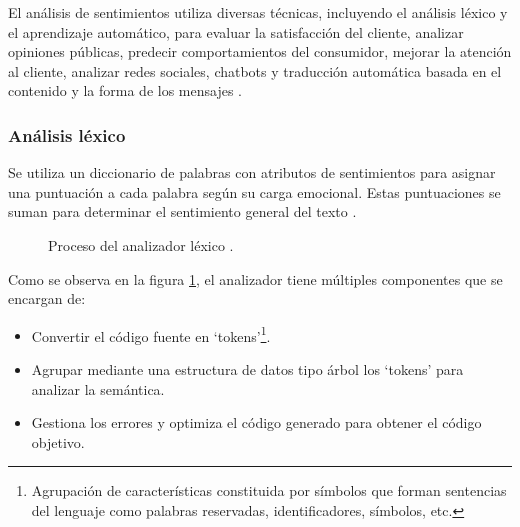 \documentclass[12pt,twoside]{article}
\begin{document}
	El análisis de sentimientos utiliza diversas técnicas, incluyendo el análisis léxico y el aprendizaje automático, para evaluar la satisfacción del cliente, analizar opiniones públicas, predecir comportamientos del consumidor, mejorar la atención al cliente, analizar redes sociales, chatbots y traducción automática basada en el contenido y la forma de los mensajes \cite{info: pln3}.
	
	\subsubsection{Análisis léxico}
	
	Se utiliza un diccionario de palabras con atributos de sentimientos para asignar una puntuación a cada palabra según su carga emocional. Estas puntuaciones se suman para determinar el sentimiento general del texto \cite{info: pln3}.
	
	\begin{figure}[h]
		\centering
		\caption{Proceso del analizador léxico \cite{info: analizador_lexico}.}
		\label{img: analizador_lexico}
	\end{figure}
	
	Como se observa en la figura \ref{img: analizador_lexico}, el analizador tiene múltiples componentes que se encargan de:
	
	\begin{itemize}[noitemsep]
		\item Convertir el código fuente en `tokens'\footnote{Agrupación de características constituida por símbolos  que forman sentencias del lenguaje como palabras reservadas, identificadores, símbolos, etc.}.
		\item Agrupar mediante una estructura de datos tipo árbol los `tokens' para analizar la semántica.
		\item Gestiona los errores y optimiza el código generado para obtener el código objetivo.
	\end{itemize}
	
\end{document}
